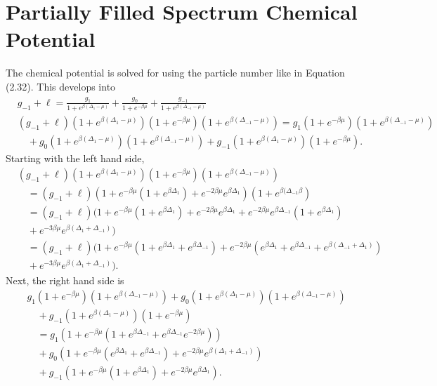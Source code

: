 \section{Partially Filled Spectrum Chemical Potential}
The chemical potential is solved for using the particle number like in Equation (2.32). This develops into  
\begin{align}
    &g_{-1}+\ell=\frac{g_1}{1+e^{\beta(\Delta_1-\mu)}}+\frac{g_0}{1+e^{-\beta\mu}}+\frac{g_{-1}}{1+e^{\beta(\Delta_{-1}-\mu)}}\\
    &(g_{-1}+\ell)(1+e^{\beta(\Delta_1-\mu)})(1+e^{-\beta\mu})(1+e^{\beta(\Delta_{-1}-\mu)})=g_1(1+e^{-\beta\mu})(1+e^{\beta(\Delta_{-1}-\mu)})\nonumber\\
    &\quad+g_0(1+e^{\beta(\Delta_1-\mu)})(1+e^{\beta(\Delta_{-1}-\mu)})+g_{-1}(1+e^{\beta(\Delta_1-\mu)})(1+e^{-\beta\mu}).
    \end{align}
Starting with the left hand side,
\begin{align}
    &(g_{-1}+\ell)(1+e^{\beta(\Delta_1-\mu)})(1+e^{-\beta\mu})(1+e^{\beta(\Delta_{-1}-\mu)})\nonumber\\
    &\quad=(g_{-1}+\ell)(1+e^{-\beta\mu}(1+e^{\beta\Delta_1})+e^{-2\beta\mu}e^{\beta\Delta_1})(1+e^{\beta(\Delta_{-1}\beta})\nonumber\\
    &\quad=(g_{-1}+\ell)(1+e^{-\beta\mu}(1+e^{\beta\Delta_1})+e^{-2\beta\mu}e^{\beta\Delta_1}+e^{-2\beta\mu}e^{\beta\Delta_{-1}}(1+e^{\beta\Delta_1})\nonumber\\
    &\quad+e^{-3\beta\mu}e^{\beta(\Delta_1+\Delta_{-1})})\nonumber\\
    &\quad=(g_{-1}+\ell)(1+e^{-\beta\mu}(1+e^{\beta\Delta_1}+e^{\beta\Delta_{-1}})+e^{-2\beta\mu}(e^{\beta\Delta_1}+e^{\beta\Delta_{-1}}+e^{\beta(\Delta_{-1}+\Delta_1)})\nonumber\\
    &\quad+e^{-3\beta\mu}e^{\beta(\Delta_1+\Delta_{-1})}).
\end{align}
Next, the right hand side is
\begin{align}
    &g_1(1+e^{-\beta\mu})(1+e^{\beta(\Delta_{-1}-\mu)})+g_0(1+e^{\beta(\Delta_1-\mu)})(1+e^{\beta(\Delta_{-1}-\mu)})\nonumber\\
    &\quad+g_{-1}(1+e^{\beta(\Delta_1-\mu)})(1+e^{-\beta\mu})\label{C8}\\
    &\quad=g_1(1+e^{-\beta\mu}(1+e^{\beta\Delta_{-1}}+e^{\beta\Delta_{-1}}e^{-2\beta\mu}))\nonumber\\
    &\quad+g_0(1+e^{-\beta\mu}(e^{\beta\Delta_1}+e^{\beta\Delta_{-1}})+e^{-2\beta\mu}e^{\beta(\Delta_1+\Delta_{-1})})\nonumber\\
    &\quad+g_{-1}(1+e^{-\beta\mu}(1+e^{\beta\Delta_1})+e^{-2\beta\mu}e^{\beta\Delta_1}). \label{C9}
\end{align}
